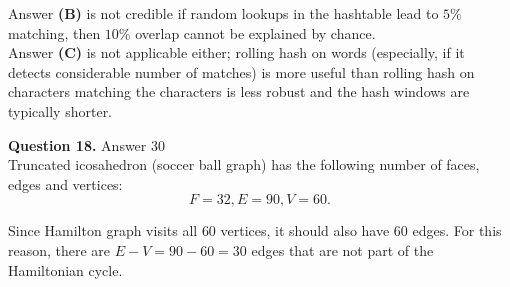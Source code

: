 \documentclass[jou]{apa6}
\begin{document}
Answer {\bf (B)} is not credible \textendash{} if random lookups in the hashtable lead to $5\%$ matching, 
then $10\%$ overlap cannot be explained by chance.\\
Answer {\bf (C)} is not applicable either; rolling hash on words (especially, if it detects considerable
number of matches) is more useful than rolling hash on characters \textendash{} matching the characters
is less robust and the hash windows are typically shorter. 


\vspace{10pt}
{\bf Question 18.} Answer $30$\\
Truncated icosahedron (soccer ball graph) has the following number of 
faces, edges and vertices:
$$F = 32, E = 90, V = 60.$$

Since Hamilton graph visits all $60$ vertices, 
it should also have $60$ edges. 
For this reason, there are $E - V = 90 - 60 = 30$ edges
that are not part of the Hamiltonian cycle.
\end{document}
